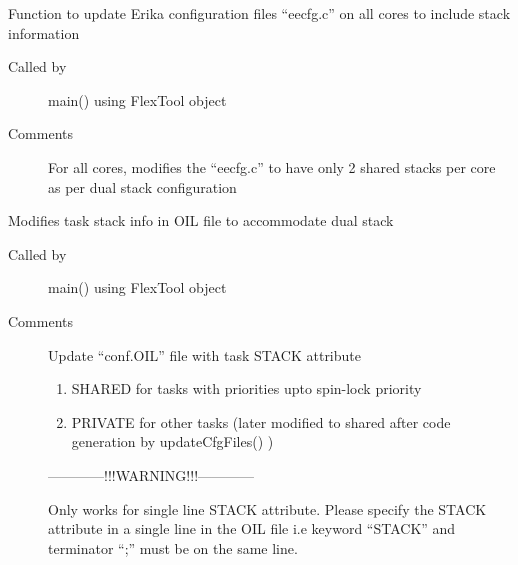 \documentclass[letterpaper,10pt,english]{sphinxmanual}
\begin{document}
\begin{fulllineitems}
\begin{fulllineitems}
\end{fulllineitems}


\begin{fulllineitems}
\label{\detokenize{code:FlexTool.FlexTool.updateCfgFiles}}
Function to update Erika configuration files “eecfg.c” on all cores to include stack information
\begin{description}
\item[{Called by}] \leavevmode{[}{]}
main() using FlexTool object

\item[{Comments}] \leavevmode{[}{]}
For all cores, modifies the “eecfg.c” to have only 2 shared stacks per core as per dual stack configuration

\end{description}

\end{fulllineitems}


\begin{fulllineitems}
\label{\detokenize{code:FlexTool.FlexTool.updateOilFile}}
Modifies task stack info in OIL file to accommodate dual stack
\begin{description}
\item[{Called by}] \leavevmode{[}{]}
main() using FlexTool object

\item[{Comments}] \leavevmode{[}{]}
Update “conf.OIL” file with task STACK attribute
\begin{enumerate}
\item {} 
SHARED for tasks with priorities upto spin-lock priority

\item {} 
PRIVATE for other tasks (later modified to shared after code generation by updateCfgFiles() )

\end{enumerate}

————\textendash{}!!!WARNING!!!————\textendash{}

Only works for single line STACK attribute.
Please specify the STACK attribute in a single line in the OIL file
i.e keyword “STACK” and terminator “;” must be on the same line.

\end{description}


\end{fulllineitems}
\end{fulllineitems}
\end{document}
